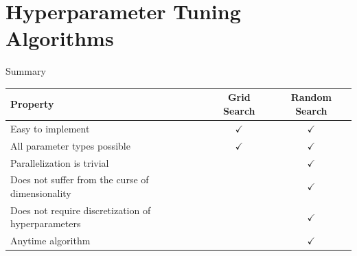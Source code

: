 \documentclass[11pt,compress,t,notes=noshow, xcolor=table]{beamer}
\begin{document}
\section{Hyperparameter Tuning Algorithms}

\begin{frame}{}
    
\end{frame}

\begin{frame}{}
    
\end{frame}

\begin{frame}{}
    
\end{frame}

\begin{frame}{}
    
\end{frame}

\begin{frame}{Summary}
    \begin{table}[]
        \centering
        \begin{tabular}{l|cc}
            Property & Grid Search & Random Search \\
            \midrule
            Easy to implement & $\checkmark$ & $\checkmark$ \\
            All parameter types possible & $\checkmark$ & $\checkmark$ \\
            Parallelization is trivial & & $\checkmark$ \\
            Does not suffer from the curse of dimensionality & & $\checkmark$ \\
            Does not require discretization of hyperparameters & & $\checkmark$ \\
            Anytime algorithm & & $\checkmark$
        \end{tabular}
    \end{table}
\end{frame}

\begin{frame}{}
    
\end{frame}
\end{document}
